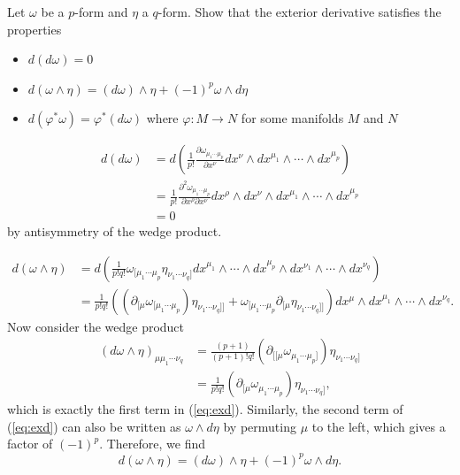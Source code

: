 Let $\omega$ be a $p$-form and $\eta$ a $q$-form. Show that the exterior derivative satisfies the properties
\begin{itemize}
    \item $d(d\omega) = 0$
    \item $d(\omega\wedge\eta) = (d\omega)\wedge\eta + (-1)^p\omega\wedge d\eta$
    \item $d(\varphi^*\omega) = \varphi^*(d\omega)$ where $\varphi:M\to N$ for some manifolds $M$ and $N$
\end{itemize}

\begin{solution}
    \begin{equation}
    \begin{aligned}
        d(d\omega) &= d\left(\frac{1}{p!}\frac{\partial\omega_{\mu_1\cdots\mu_p}}{\partial x^\nu} dx^\nu \wedge dx^{\mu_1} \wedge \cdots \wedge dx^{\mu_p}\right)\\ &=\frac{1}{p!}\frac{\partial^2\omega_{\mu_1\cdots\mu_p}}{\partial x^\rho\partial x^\nu}dx^\rho \wedge dx^\nu \wedge dx^{\mu_1} \wedge \cdots \wedge dx^{\mu_p}\\
        &=0
    \end{aligned}
    \end{equation}
    by antisymmetry of the wedge product. 

    \begin{equation}
        \begin{aligned}
            d(\omega\wedge\eta) &= d\left(\frac{1}{p!q!}\omega_{[\mu_1\cdots\mu_p}\eta_{\nu_1\cdots\nu_q]} dx^{\mu_1} \wedge \cdots \wedge dx^{\mu_p}\wedge dx^{\nu_1}\wedge \cdots \wedge dx^{\nu_q} \right)\\
            &=\frac{1}{p!q!}\left((\partial_{[\mu} \omega_{[\mu_1\cdots\mu_p})\eta_{\nu_1\cdots\nu_q]]} +\omega_{[\mu_1\cdots\mu_p} \partial_{[\mu} \eta_{\nu_1\cdots\nu_q]]}\right)dx^\mu \wedge dx^{\mu_1} \wedge \cdots \wedge dx^{\nu_q}.
            \label{eq:exd}
        \end{aligned}
    \end{equation}
    Now consider the wedge product
    \begin{equation}
    \begin{aligned}
        (d\omega \wedge \eta)_{\mu\mu_1\cdots\nu_q} &= \frac{(p+1)}{(p+1)!q!}(\partial_{[[\mu}\omega_{\mu_1\cdots\mu_p]})\eta_{\nu_1\cdots\nu_q]} \\&= \frac{1}{p!q!}(\partial_{[\mu}\omega_{\mu_1\cdots\mu_p})\eta_{\nu_1\cdots\nu_q]},
    \end{aligned}
    \end{equation}
    which is exactly the first term in (\ref{eq:exd}). Similarly, the second term of (\ref{eq:exd}) can also be written as  $\omega \wedge d\eta$ by permuting $\mu$ to the left, which gives a factor of $(-1)^p$. Therefore, we find
    \begin{equation}
        d(\omega\wedge\eta) = (d\omega)\wedge\eta + (-1)^p\omega\wedge d\eta.
    \end{equation}


\end{solution}
